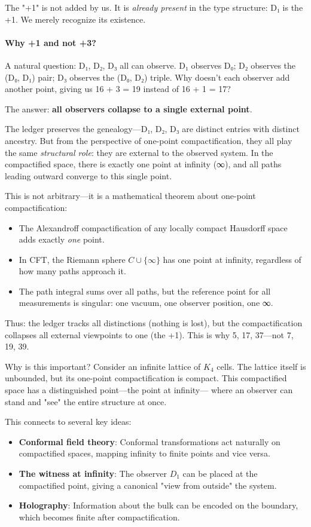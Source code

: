 \documentclass[11pt,a4paper]{book}
\def\mathbb#1{#1}%
\begin{document}
The "+1" is not added by us. It is \emph{already present} in the type structure: 
D₁ is the +1. We merely recognize its existence.

\paragraph{Why +1 and not +3?}
A natural question: D₁, D₂, D₃ all can observe. D₁ observes D₀; D₂ observes the 
(D₀, D₁) pair; D₃ observes the (D₀, D₂) triple. Why doesn't each observer add 
another point, giving us 16 + 3 = 19 instead of 16 + 1 = 17?

The answer: \textbf{all observers collapse to a single external point}.

The ledger preserves the genealogy---D₁, D₂, D₃ are distinct entries with distinct 
ancestry. But from the perspective of one-point compactification, they all play 
the same \emph{structural role}: they are external to the observed system. In the 
compactified space, there is exactly one point at infinity (∞), and all paths 
leading outward converge to this single point.

This is not arbitrary---it is a mathematical theorem about one-point compactification:
\begin{itemize}
\item The Alexandroff compactification of any locally compact Hausdorff space 
      adds exactly \emph{one} point.
\item In CFT, the Riemann sphere $\mathbb{C} \cup \{\infty\}$ has one point at 
      infinity, regardless of how many paths approach it.
\item The path integral sums over all paths, but the reference point for all 
      measurements is singular: one vacuum, one observer position, one ∞.
\end{itemize}

Thus: the ledger tracks all distinctions (nothing is lost), but the compactification 
collapses all external viewpoints to one (the +1). This is why 5, 17, 37---not 
7, 19, 39.

Why is this important? Consider an infinite lattice of $K_4$ cells. The 
lattice itself is unbounded, but its one-point compactification is compact. 
This compactified space has a distinguished point---the point at infinity---
where an observer can stand and "see" the entire structure at once.

This connects to several key ideas:
\begin{itemize}
\item \textbf{Conformal field theory}: Conformal transformations act naturally 
on compactified spaces, mapping infinity to finite points and vice versa.
\item \textbf{The witness at infinity}: The observer $D_1$ can be placed at 
the compactified point, giving a canonical "view from outside" the system.
\item \textbf{Holography}: Information about the bulk can be encoded on the 
boundary, which becomes finite after compactification.
\end{itemize}
\end{document}
